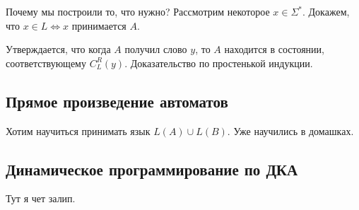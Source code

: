 Почему мы построили то, что нужно? Рассмотрим некоторое $ x \in \Sigma^* $. Докажем, что $ x \in L \Leftrightarrow x $ принимается $ A $. 

Утверждается, что когда $ A $ получил слово $ y $, то $ A $ находится в состоянии, соответствующему $ C_L^R(y) $. Доказательство по простенькой индукции.



\subsection{Прямое произведение автоматов}

Хотим научиться принимать язык $ L(A) \cup L(B) $. Уже научились в домашках.

\bigskip

\subsection{Динамическое программирование по ДКА}

Тут я чет залип. 
